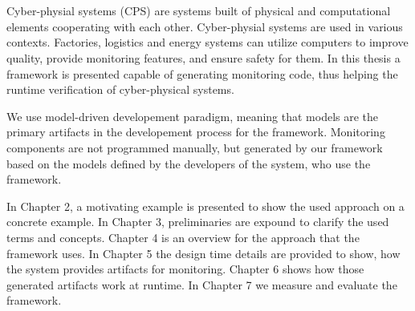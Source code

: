 \chapter{\bevezetes}

Cyber-physial systems (CPS) are systems built of physical and computational elements cooperating with each other. 
Cyber-physial systems are used in various contexts. Factories, logistics and energy systems can utilize computers to improve quality, provide monitoring features, and ensure safety for them. 
In this thesis a framework is presented capable of generating monitoring code, thus helping the runtime verification of cyber-physical systems. 

We use model-driven developement paradigm, meaning that models are the primary artifacts in the developement process for the framework.
Monitoring components are not programmed manually, but generated by our framework based on the models defined by the developers of the system, who use the framework.

In Chapter 2, a motivating example is presented to show the used approach on a concrete example.
In Chapter 3, preliminaries are expound to clarify the used terms and concepts.
Chapter 4 is an overview for the approach that the framework uses.
In Chapter 5 the design time details are provided to show, how the system provides artifacts for monitoring.
Chapter 6 shows how those generated artifacts work at runtime. In Chapter 7 we measure and evaluate the framework.